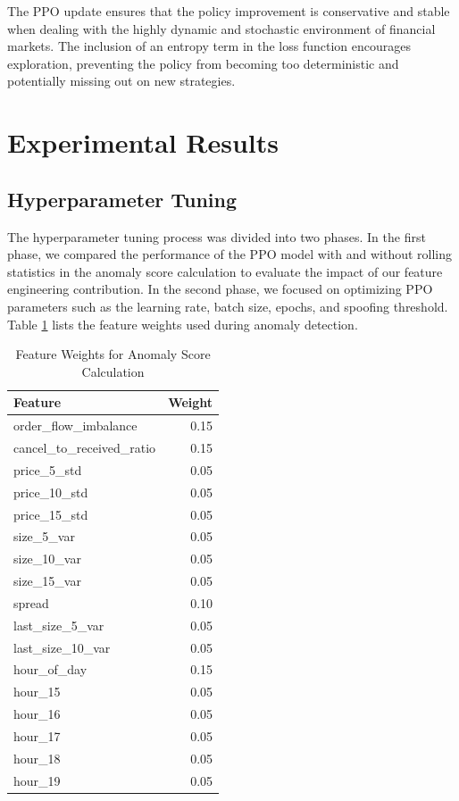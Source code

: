 \documentclass[conference]{IEEEtran}
\begin{document}
\par The PPO update ensures that the policy improvement is conservative and stable when dealing with the highly dynamic and stochastic environment of financial markets. The inclusion of an entropy term in the loss function encourages exploration, preventing the policy from becoming too deterministic and potentially missing out on new strategies.

\section{Experimental Results}
\subsection{Hyperparameter Tuning}
\par The hyperparameter tuning process was divided into two phases. In the first phase, we compared the performance of the PPO model with and without rolling statistics in the anomaly score calculation to evaluate the impact of our feature engineering contribution. In the second phase, we focused on optimizing PPO parameters such as the learning rate, batch size, epochs, and spoofing threshold. Table \ref{tab:hyper_init} lists the feature weights used during anomaly detection.

\begin{table}[H]
    \centering
    \caption{Feature Weights for Anomaly Score Calculation}
    \label{tab:hyper_init}
    \begin{tabular}{|l|r|}
        \hline
        \textbf{Feature} & \textbf{Weight} \\
        \hline
        order\_flow\_imbalance & 0.15 \\
        cancel\_to\_received\_ratio & 0.15 \\
        price\_5\_std & 0.05 \\
        price\_10\_std & 0.05 \\
        price\_15\_std & 0.05 \\
        size\_5\_var & 0.05 \\
        size\_10\_var & 0.05 \\
        size\_15\_var & 0.05 \\
        spread & 0.10 \\
        last\_size\_5\_var & 0.05 \\
        last\_size\_10\_var & 0.05 \\
        hour\_of\_day & 0.15 \\
        hour\_15 & 0.05 \\
        hour\_16 & 0.05 \\
        hour\_17 & 0.05 \\
        hour\_18 & 0.05 \\
        hour\_19 & 0.05 \\
        \hline
    \end{tabular}
\end{table}
\end{document}
